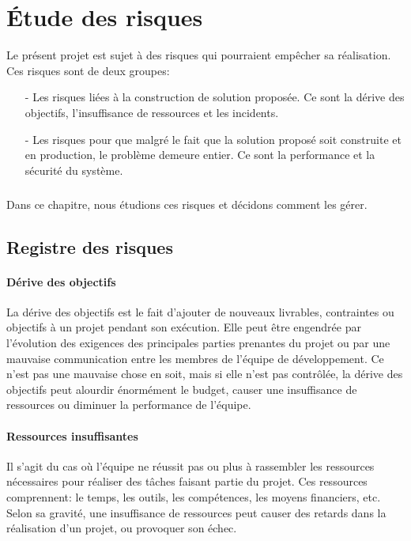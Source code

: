 \chapter{\'Etude des risques}
	Le pr\'esent projet est sujet \`a des risques qui pourraient emp\^echer sa r\'ealisation. Ces risques sont de deux groupes:

	\begin{itemize}
		\item[-] Les risques li\'ees \`a la construction de solution propos\'ee. Ce sont la d\'erive des objectifs, l'insuffisance de ressources et les incidents.
		\item[-] Les risques pour que malgr\'e le fait que la solution propos\'e soit construite et en production, le probl\`eme demeure entier. Ce sont la performance et la s\'ecurit\'e du syst\`eme.
	\end{itemize}

	\paragraph{} Dans ce chapitre, nous \'etudions ces risques et d\'ecidons comment les g\'erer.

	\section{Registre des risques}
		\subsubsection{D\'erive des objectifs\cite{DeriveDesObjectifs}}
			La d\'erive des objectifs est le fait d'ajouter de nouveaux livrables,  contraintes ou objectifs \`a un projet pendant son ex\'ecution. Elle peut \^etre engendr\'ee par l'\'evolution des exigences des principales parties prenantes du projet ou par une mauvaise communication entre les membres de l'\'equipe de d\'eveloppement. Ce n'est pas une mauvaise chose en soit, mais si elle n'est pas contr\^ol\'ee, la d\'erive des objectifs peut alourdir \'enorm\'ement le budget, causer une insuffisance de ressources ou diminuer la performance de l'\'equipe.

		\subsubsection{Ressources insuffisantes\cite{RessourcesInsuffisantes1, RessourcesInsuffisantes2}}
			Il s'agit du cas o\`u l'\'equipe ne r\'eussit pas ou plus \`a rassembler les ressources n\'ecessaires pour r\'ealiser des t\^aches faisant partie du projet. Ces ressources comprennent: le temps, les outils, les comp\'etences, les moyens financiers, etc. Selon sa gravit\'e, une insuffisance de ressources peut causer des retards dans la r\'ealisation d'un projet, ou provoquer son \'echec.


